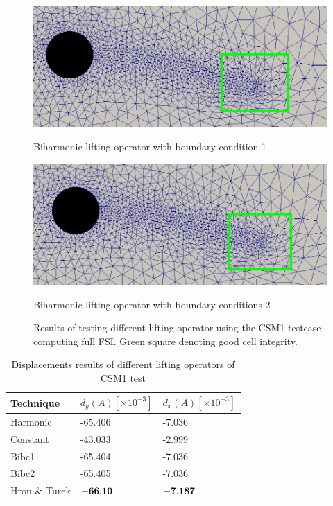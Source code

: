 \begin{figure}[H]
\begin{minipage}[b]{0.6\linewidth}
    \includegraphics[scale=0.25]{./Mesh_motion_results/CSM1_bibc1_rectangle.png} 
    \caption{Biharmonic lifting operator with boundary condition 1} 
    \vspace{4ex}
  \end{minipage}%
  \begin{minipage}[b]{0.6\linewidth}
    \centering
    \includegraphics[scale=0.25]{./Mesh_motion_results/CSM1_bibc2_rectangle.png} 
    \caption{Biharmonic lifting operator with boundary conditions 2} 
    \vspace{4ex}
  \end{minipage} 
  \caption{Results of testing different lifting operator using the CSM1 testcase computing full FSI. Green square denoting good cell integrity.}
  \label{fig:CSM1_pictures} 
\end{figure}

\begin{table}[H]
\centering
\caption{Displacements results of different lifting operators of CSM1 test}
\label{tab:comparing lifting}
\begin{tabular}{|l|l|l|}
\hline
Technique & $d_y(A) [\times 10^{-3}]$ & $d_x(A) [\times 10^{-3}]$ \\ \hline
Harmonic & -65.406 & -7.036 \\ \hline
Constant & -43.033 & -2.999 \\ \hline
Bibc1 & -65.404 & -7.036 \\ \hline
Bibc2 & -65.405 & -7.036 \\ \hline
Hron \& Turek & $\bold{-66.10}$& $\bold{-7.187}$\\ \hline
\end{tabular}
\end{table}

